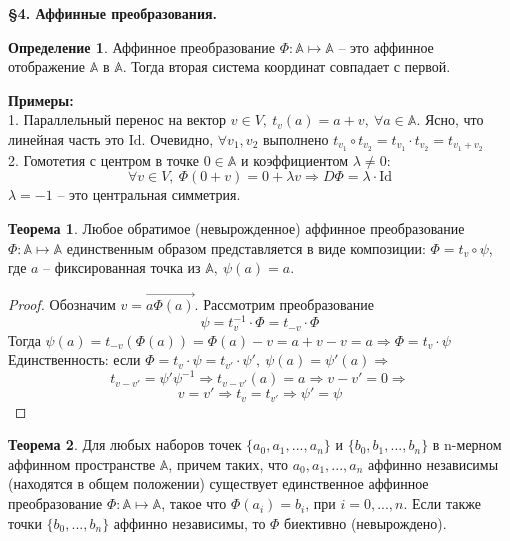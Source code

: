 \documentclass[a4paper, 12pt]{article}
\theoremstyle{definition}
\newtheorem*{definition}{Определение}
\newtheorem*{theorem}{Теорема}
\begin{document}
    \begin{center}
        \begin{Large}
            \textbf{\S4. Аффинные преобразования.}
        \end{Large}
    \end{center}
    \begin{definition}
        Аффинное преобразование $\Phi:\mathbb{A}  \longmapsto 
        \mathbb{A} $ -- 
        это аффинное отображение $\mathbb{A} $ в $\mathbb{A} $. 
        Тогда вторая 
        система координат совпадает с первой.   
    \end{definition}
    \textbf{Примеры:}\\
    1. Параллельный перенос на вектор $v \in V,\ t_v(a) = 
    a + v,\ \forall a \in \mathbb{A}$. Ясно, что линейная
    часть это $\text{Id}$. Очевидно, $\forall v_1, v_2$
    выполнено $t_{v_1}\circ t_{v_2} = t_{v_1}\cdot t_{v_2} = 
    t_{v_1 + v_2}$\\
    2. Гомотетия с центром в точке $0 \in \mathbb{A}$ и 
    коэффициентом $\lambda \neq 0:$
    $$\forall v \in V,\ \Phi(0 + v) = 0 + \lambda v 
    \Longrightarrow D \Phi = \lambda\cdot \text{Id}$$
    $\lambda = -1$ -- это центральная симметрия.  
    \begin{theorem}
        Любое обратимое (невырожденное) аффинное преобразование
        $\Phi:\mathbb{A} \longmapsto \mathbb{A}$ единственным 
        образом представляется в виде композиции:
        $\Phi = t_v \circ \psi$, где $a$ -- фиксированная 
        точка из $\mathbb{A},\ \psi(a) = a$.
    \end{theorem}
    \begin{proof}
        Обозначим $v = \overrightarrow{a \Phi(a)}$. Рассмотрим
        преобразование $$\psi = t_v^{-1}\cdot \Phi = t_{-v}
        \cdot \Phi$$
        Тогда 
        $\psi(a) = t_{-v}(\Phi(a)) = \Phi(a) - v = a + v - v
        = a \Longrightarrow \Phi = t_v \cdot \psi$\\
        Единственность: если $\Phi = t_v\cdot \psi = t_{v'}
        \cdot \psi',\ \psi(a) = \psi'(a) \Longrightarrow 
        $$$t_{v - v'} = \psi'\psi^{-1} \Longrightarrow 
        t_{v - v'}(a) = a \Longrightarrow v - v' = 0 
        \Longrightarrow$$
        $$ v = v' \Longrightarrow t_v = t_{v'}  \Longrightarrow 
        \psi' = \psi$$ 
    \end{proof}
    \begin{theorem}
        Для любых наборов точек $\{a_0,a_1,...,a_n\}$ и 
        $\{b_0,b_1,...,b_n\}$ в n-мерном аффинном 
        пространстве $\mathbb{A}$, причем таких, что 
        $a_0,a_1,...,a_n$ аффинно независимы (находятся в 
        общем положении) существует единственное 
        аффинное преобразование $\Phi:\mathbb{A} \longmapsto 
        \mathbb{A}$, такое что $\Phi(a_i) = b_i$, при 
        $i = 0,...,n$. Если также точки $\{b_0,...,b_n\}$ 
        аффинно независимы, то $\Phi$ биективно 
        (невырождено).       
    \end{theorem}
\end{document}

